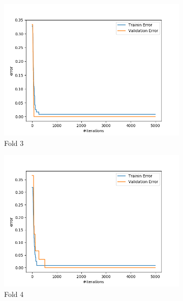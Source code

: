 \documentclass[11pt]{scrartcl}
\begin{document}
\begin{enumerate}
\begin{figure}[h!]
\begin{subfigure}[b]{0.4\linewidth}
					\includegraphics[width=\linewidth]{errorPlotFold3.png}
					\caption{Fold 3}
				\end{subfigure}
				\begin{subfigure}[b]{0.4\linewidth}
					\includegraphics[width=\linewidth]{errorPlotFold4.png}
					\caption{Fold 4}
				\end{subfigure}
				\begin{subfigure}[b]{0.4\linewidth}

\end{subfigure}
\end{figure}
\end{enumerate}
\end{document}
